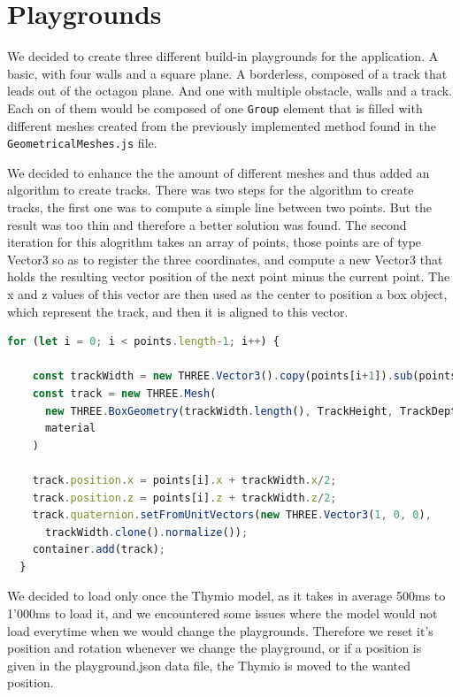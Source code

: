 \documentclass{scrbook}
\begin{document}
\section{Playgrounds}

We decided to create three different build-in playgrounds for the application. A basic, with four walls and a square plane. A borderless, composed of a track that leads out of the octagon plane. And one with multiple obstacle, walls and a track. 
Each on of them would be composed of one \texttt{Group} element that is filled with different meshes created from the previously implemented method found in the \texttt{GeometricalMeshes.js} file.

We decided to enhance the the amount of different meshes and thus added an algorithm to create tracks. There was two steps for the algorithm to create tracks, the first one was to compute a simple line between two points. 
But the result was too thin and therefore a better solution was found.
The second iteration for this alogrithm takes an array of points, those points are of type Vector3 so as to register the three coordinates, and compute 
a new Vector3 that holds the resulting vector position of the next point minus the current point. The x and z values of this vector are then used 
as the center to position a box object, which represent the track, and then it is aligned to this vector.
\begin{lstlisting}[language=JavaScript, basicstyle=\ttfamily\small]
  for (let i = 0; i < points.length-1; i++) {

    const trackWidth = new THREE.Vector3().copy(points[i+1]).sub(points[i]);
    const track = new THREE.Mesh(
      new THREE.BoxGeometry(trackWidth.length(), TrackHeight, TrackDepth),
      material
    )

    track.position.x = points[i].x + trackWidth.x/2;
    track.position.z = points[i].z + trackWidth.z/2;
    track.quaternion.setFromUnitVectors(new THREE.Vector3(1, 0, 0), 
      trackWidth.clone().normalize());
    container.add(track);      
  }
\end{lstlisting} 

We decided to load only once the Thymio model, as it takes in average 500ms to 1'000ms to load it, and we encountered some issues where the model would not load everytime when we would change the playgrounds.
Therefore we reset it's position and rotation whenever we change the playground, or if a position is given in the playground.json data file, the Thymio is moved to the wanted position.
\end{document}
